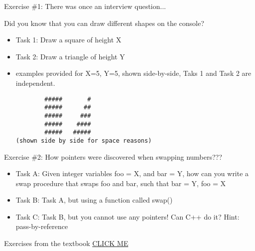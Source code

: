 

    
\begin{frame}[fragile]{Exercise \#1: There was once an interview question...}

Did you know that you can draw different shapes on the console?

    \begin{itemize}
        \item Task 1: Draw a square of height X
        \item Task 2: Draw a triangle of height Y
        \item examples provided for X=5, Y=5, shown side-by-side, Taks 1 and Task 2 are independent.    %
        \begin{lstlisting}
        #####       #
        #####      ##
        #####     ###
        #####    ####
        #####   #####
(shown side by side for space reasons) \end{lstlisting}
    \end{itemize}      


\end{frame}

\begin{frame}{Exercise \#2: How pointers were discovered when swapping numbers???}

    \begin{itemize}
        \item Task A: Given integer variables foo = X, and bar = Y, how can you write a swap procedure that swaps foo and bar, such that bar = Y, foo = X
    
        \item Task B: Task A, but using a function called swap()
    
        \item Task C: Task B, but you cannot use any pointers! Can C++ do it?
        Hint: pass-by-reference
    \end{itemize}      
\end{frame}

\begin{frame}{Exercises from the textbook}
    \href{https://learningcpp.org/chapters/chapter01-basics/exercises}{CLICK ME}
\end{frame}

